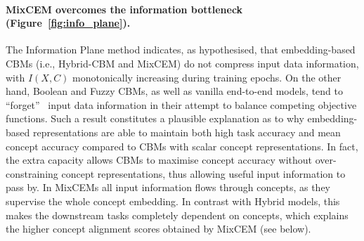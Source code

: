 \paragraph{MixCEM overcomes the information bottleneck (Figure~\ref{fig:info_plane}).}
The Information Plane method indicates, as hypothesised, that embedding-based CBMs (i.e., Hybrid-CBM and MixCEM) do not compress input data information, with $I(X, C)$ monotonically increasing during training epochs. On the other hand, Boolean and Fuzzy CBMs, as well as vanilla end-to-end models, tend to ``forget''~\citep{shwartz2017opening} input data information in their attempt to balance competing objective functions. Such a result constitutes a plausible explanation as to why embedding-based representations are able to maintain both high task accuracy and mean concept accuracy compared to CBMs with scalar concept representations. In fact, the extra capacity allows CBMs to maximise concept accuracy without over-constraining concept representations, thus allowing useful input information to pass by. In MixCEMs all input information flows through concepts, as they supervise the whole concept embedding. In contrast with Hybrid models, this makes the downstream tasks completely dependent on concepts, which explains the higher concept alignment scores obtained by MixCEM (see below).
